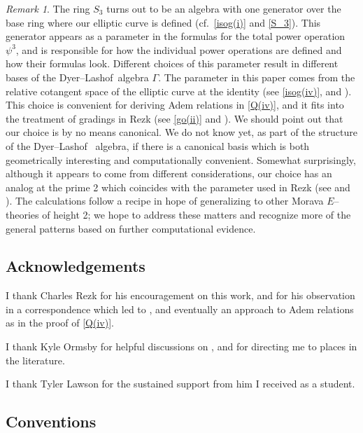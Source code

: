 \documentclass[microtype]{gtpart}     %
\theoremstyle{remark}
\newtheorem{rmk}{Remark}[section]
\theoremstyle{definition}
\newcommand{\DL}{Dyer--Lashof~}
\newcommand{\G}{\Gamma}
\newcommand{\p}{\psi^3}
\newcommand{\isog}[1]{\fullref{prop:isog}\thinspace \eqref{isog(#1)}}
\newcommand{\q}[1]{\fullref{prop:Q}\thinspace \eqref{Q(#1)}}
\newcommand{\go}[1]{\fullref{def:go}\thinspace \eqref{go(#1)}}
\begin{document}
\begin{rmk}
 The ring $S_3$ turns out to be an algebra with one generator over the base 
 ring where our elliptic curve is defined (cf.~\isog{i} and \eqref{S_3}).  
 This generator appears as a parameter in the formulas for the total power 
 operation $\p$, and is responsible for how the individual power operations 
 are defined and how their formulas look.  Different choices of this 
 parameter result in different bases of the \DL algebra $\G$.  The parameter 
 in this paper comes from the relative cotangent space of the elliptic curve 
 at the identity (see \isog{iv},  and ).  
 This choice is convenient for deriving Adem relations in \q{iv}, and it fits 
 into the treatment of gradings in Rezk \cite[Section 2]{cong} (see \go{ii} 
 and ).  We should point out that our choice is by no 
 means canonical.  We do not know yet, as part of the structure of the \DL 
 algebra, if there is a canonical basis which is both geometrically 
 interesting and computationally convenient.  Somewhat surprisingly, although 
 it appears to come from different considerations, our choice has an analog 
 at the prime 2 which coincides with the parameter used in Rezk \cite{h2p2} 
 (see  and ).  The calculations follow a 
 recipe in hope of generalizing to other Morava $E$--theories of height 2; we 
 hope to address these matters and recognize more of the general patterns 
 based on further computational evidence.  
\end{rmk}


\subsection{Acknowledgements}

I thank Charles Rezk for his encouragement on this work, and for his 
observation in a correspondence which led to , 
 and eventually an approach to Adem relations as in the proof 
of \q{iv}.  

I thank Kyle Ormsby for helpful discussions on , and for 
directing me to places in the literature.  

I thank Tyler Lawson for the sustained support from him I received as a 
student.  


\subsection{Conventions}
\end{document}
